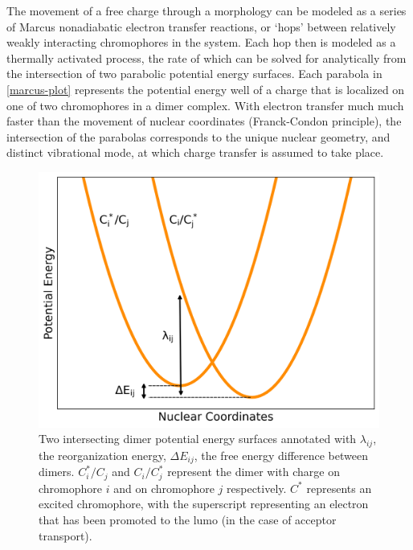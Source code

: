 The movement of a free charge through a morphology can be modeled as a series of 
Marcus nonadiabatic electron transfer
reactions, or `hops' between relatively weakly interacting chromophores in the system. 
Each hop then is modeled as a thermally activated process, the rate of which can be solved for analytically
from the intersection of two parabolic potential energy surfaces. 
Each parabola in \autoref{marcus-plot} represents the potential energy well of a charge that is localized on
one of two chromophores in a dimer complex. 
With electron transfer much much faster than the movement of nuclear coordinates (Franck-Condon principle),
the intersection of the parabolas corresponds to the unique nuclear geometry, and distinct vibrational mode, at
which charge transfer is assumed to take place. 

\begin{figure}
  \center
  \includegraphics[width=0.7\linewidth]{figures/marcus-plot.png} 
    \caption{Two intersecting dimer potential energy surfaces annotated with $\lambda_{ij}$, the
    reorganization energy, $\Delta E_{ij}$, the free energy difference between dimers. $C_{i}^*/C_{j}$ 
    and $C_{i}/C_{j}^*$ represent the dimer with charge on chromophore $i$ and on
    chromophore $j$ respectively. $C^{*}$ represents an excited chromophore, with the superscript
    representing an electron that has been promoted to the \gls{lumo} (in the case of acceptor transport).}
  \label{marcus-plot}
\end{figure}

